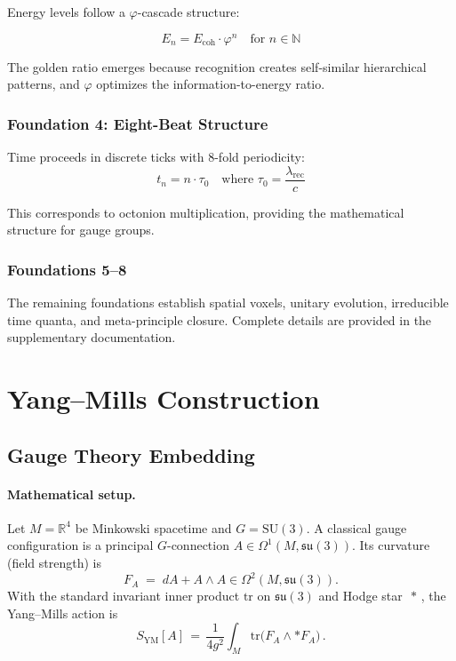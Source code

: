 \documentclass[11pt]{amsart}
\newcommand{\Ecoh}{E_{\text{coh}}}
\newcommand{\lambdarec}{\lambda_{\text{rec}}}
\newcommand{\taunaught}{\tau_0}
\begin{document}
Energy levels follow a $\varphi$-cascade structure:

\begin{equation}
E_n = \Ecoh \cdot \varphi^n \quad \text{for } n \in \mathbb{N}
\end{equation}

The golden ratio emerges because recognition creates self-similar hierarchical patterns, and $\varphi$ optimizes the information-to-energy ratio.

\subsubsection{Foundation 4: Eight-Beat Structure}

Time proceeds in discrete ticks with 8-fold periodicity:
\begin{equation}
t_n = n \cdot \taunaught \quad \text{where } \taunaught = \frac{\lambdarec}{c}
\end{equation}

This corresponds to octonion multiplication, providing the mathematical structure for gauge groups.

\subsubsection{Foundations 5--8}

The remaining foundations establish spatial voxels, unitary evolution, irreducible time quanta, and meta-principle closure. Complete details are provided in the supplementary documentation.

\section{Yang--Mills Construction}

\subsection{Gauge Theory Embedding}

\paragraph{Mathematical setup.} Let $M=\mathbb R^4$ be Minkowski spacetime and $G=\mathrm{SU}(3)$. A classical gauge configuration is a principal $G$-connection $A\in\Omega^1(M,\mathfrak{su}(3))$. Its curvature (field strength) is
\[
F_A \;=\; dA + A\wedge A \in \Omega^2(M,\mathfrak{su}(3)).
\]
With the standard invariant inner product $\mathrm{tr}$ on $\mathfrak{su}(3)$ and Hodge star $\,*\,$, the Yang--Mills action is
\[
S_{\mathrm{YM}}[A] \,=\, \frac{1}{4g^2}\int_M \mathrm{tr}\big(F_A \wedge *F_A\big) \,.
\]
\end{document}
